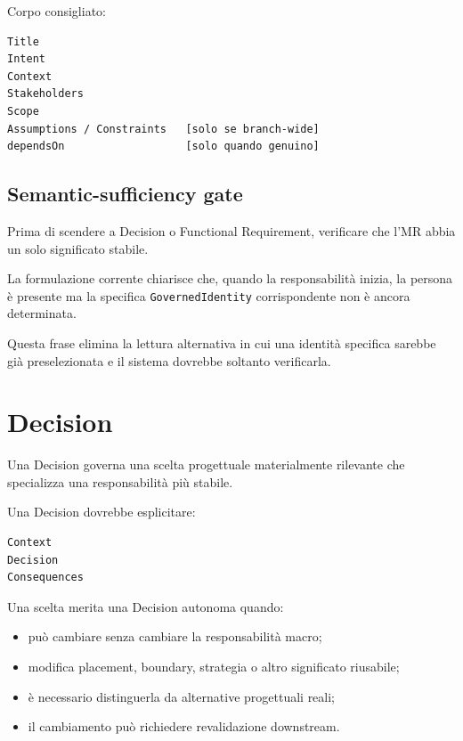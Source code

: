 \documentclass[11pt,a4paper]{article}
\newcommand{\code}[1]{\nolinkurl{#1}}
\begin{document}
Corpo consigliato:

\begin{lstlisting}
Title
Intent
Context
Stakeholders
Scope
Assumptions / Constraints   [solo se branch-wide]
dependsOn                   [solo quando genuino]
\end{lstlisting}

\subsection{Semantic-sufficiency gate}

Prima di scendere a Decision o Functional Requirement, verificare che l'MR abbia un solo significato stabile.

\begin{examplebox}[MR-0003]
La formulazione corrente chiarisce che, quando la responsabilità inizia, la persona è presente ma la specifica \code{GovernedIdentity} corrispondente non è ancora determinata.

Questa frase elimina la lettura alternativa in cui una identità specifica sarebbe già preselezionata e il sistema dovrebbe soltanto verificarla.
\end{examplebox}

\section{Decision}

Una Decision governa una scelta progettuale materialmente rilevante che specializza una responsabilità più stabile.

Una Decision dovrebbe esplicitare:

\begin{lstlisting}
Context
Decision
Consequences
\end{lstlisting}

Una scelta merita una Decision autonoma quando:

\begin{itemize}
\item può cambiare senza cambiare la responsabilità macro;
\item modifica placement, boundary, strategia o altro significato riusabile;
\item è necessario distinguerla da alternative progettuali reali;
\item il cambiamento può richiedere revalidazione downstream.
\end{itemize}
\end{document}
